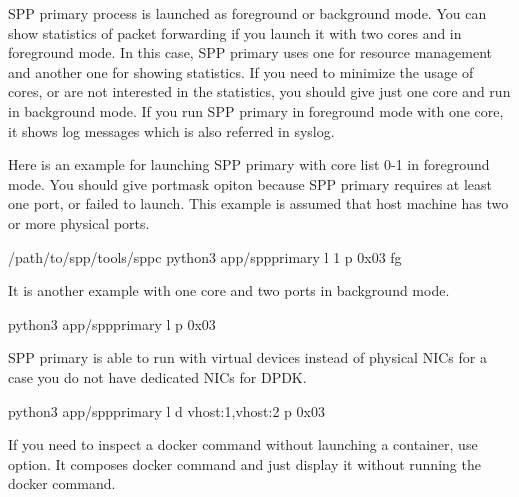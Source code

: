 \documentclass[a4paper,11pt,openany,oneside,english]{sphinxmanual}
\begin{document}
SPP primary process is launched as foreground or background mode.
You can show statistics of packet forwarding if you launch it with
two cores and in foreground mode.
In this case, SPP primary uses one for resource management and
another one for showing statistics.
If you need to minimize the usage of cores, or are not interested in
the statistics,
you should give just one core and run in background mode.
If you run SPP primary in foreground mode with one core,
it shows log messages which is also referred in syslog.

Here is an example for launching SPP primary with core list 0-1 in
foreground mode.
You should give portmask opiton  because SPP primary requires
at least one port, or failed to launch.
This example is assumed that host machine has two or more
physical ports.

\begin{sphinxVerbatim}[commandchars=\\\{\},formatcom=\footnotesize]
  /path/to/spp/tools/sppc
 python3 app/spp\PYGZhy{}primary \PYGZhy{}l \PYGZhy{}1 \PYGZhy{}p 0x03 \PYGZhy{}fg
\end{sphinxVerbatim}

It is another example with one core and two ports in background mode.

\begin{sphinxVerbatim}[commandchars=\\\{\},formatcom=\footnotesize]
 python3 app/spp\PYGZhy{}primary \PYGZhy{}l  \PYGZhy{}p 0x03
\end{sphinxVerbatim}

SPP primary is able to run with virtual devices instead of physical NICs
for a case you do not have dedicated NICs for DPDK.

\begin{sphinxVerbatim}[commandchars=\\\{\},formatcom=\footnotesize]
 python3 app/spp\PYGZhy{}primary \PYGZhy{}l  \PYGZhy{}d vhost:1,vhost:2 \PYGZhy{}p 0x03
\end{sphinxVerbatim}

If you need to inspect a docker command without launching
a container, use  option.
It composes docker command and just display it without running the
docker command.
\end{document}
